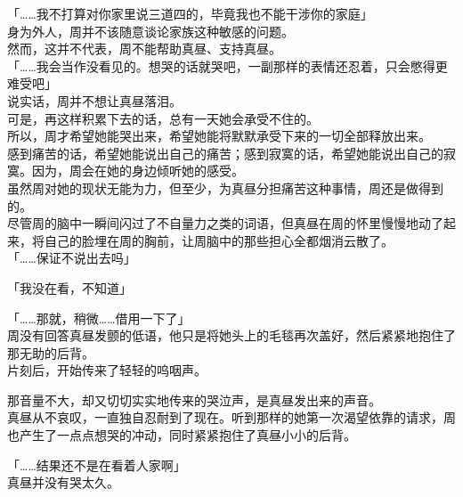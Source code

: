 「……我不打算对你家里说三道四的，毕竟我也不能干涉你的家庭」\\

身为外人，周并不该随意谈论家族这种敏感的问题。\\

然而，这并不代表，周不能帮助真昼、支持真昼。\\

「……我会当作没看见的。想哭的话就哭吧，一副那样的表情还忍着，只会憋得更难受吧」\\

说实话，周并不想让真昼落泪。\\

可是，再这样积累下去的话，总有一天她会承受不住的。\\

所以，周才希望她能哭出来，希望她能将默默承受下来的一切全部释放出来。\\

感到痛苦的话，希望她能说出自己的痛苦；感到寂寞的话，希望她能说出自己的寂寞。因为，周会在她的身边倾听她的感受。\\

虽然周对她的现状无能为力，但至少，为真昼分担痛苦这种事情，周还是做得到的。\\

尽管周的脑中一瞬间闪过了不自量力之类的词语，但真昼在周的怀里慢慢地动了起来，将自己的脸埋在周的胸前，让周脑中的那些担心全都烟消云散了。\\

「……保证不说出去吗」

「我没在看，不知道」

「……那就，稍微……借用一下了」\\

周没有回答真昼发颤的低语，他只是将她头上的毛毯再次盖好，然后紧紧地抱住了那无助的后背。\\

片刻后，开始传来了轻轻的呜咽声。

那音量不大，却又切切实实地传来的哭泣声，是真昼发出来的声音。\\

真昼从不哀叹，一直独自忍耐到了现在。听到那样的她第一次渴望依靠的请求，周也产生了一点点想哭的冲动，同时紧紧抱住了真昼小小的后背。\\

\vspace{2\baselineskip}

「……结果还不是在看着人家啊」\\

真昼并没有哭太久。

